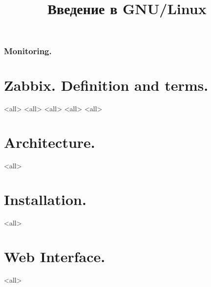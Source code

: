 

\title{Введение в GNU/Linux}




\begin{frame}
	\frametitle{Monitoring.}
	\titlepage
	\vspace{-0.5cm}
	\begin{center}
	\end{center}
\end{frame}


\begin{frame}
	\tableofcontents
	[hideallsubsections]
\end{frame}


\section{Zabbix. Definition and terms.}
\mode<all>{}
\mode<all>{}
\mode<all>{}
\mode<all>{}
\mode<all>{}
\section{Architecture.}
\mode<all>{}
\section{Installation.}
\mode<all>{}
\section{Web Interface.}
\mode<all>{}


